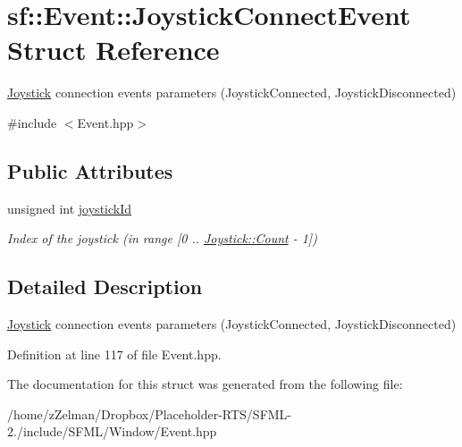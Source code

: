 \hypertarget{structsf_1_1Event_1_1JoystickConnectEvent}{\section{sf\-:\-:Event\-:\-:Joystick\-Connect\-Event Struct Reference}
\label{structsf_1_1Event_1_1JoystickConnectEvent}
}


\hyperlink{classsf_1_1Joystick}{Joystick} connection events parameters (Joystick\-Connected, Joystick\-Disconnected)  




{\ttfamily \#include $<$Event.\-hpp$>$}

\subsection*{Public Attributes}
\begin{DoxyCompactItemize}
\item 
\hypertarget{structsf_1_1Event_1_1JoystickConnectEvent_a08e58e8559d3e4fe4654855fec79194b}{unsigned int \hyperlink{structsf_1_1Event_1_1JoystickConnectEvent_a08e58e8559d3e4fe4654855fec79194b}{joystick\-Id}}\label{structsf_1_1Event_1_1JoystickConnectEvent_a08e58e8559d3e4fe4654855fec79194b}

\begin{DoxyCompactList}\small\item\em Index of the joystick (in range \mbox{[}0 .. \hyperlink{classsf_1_1Joystick_a951a7c775921304a5f3443c6e2bb4d65a6e0a2a95bc1da277610c04d80f52715e}{Joystick\-::\-Count} -\/ 1\mbox{]}) \end{DoxyCompactList}\end{DoxyCompactItemize}


\subsection{Detailed Description}
\hyperlink{classsf_1_1Joystick}{Joystick} connection events parameters (Joystick\-Connected, Joystick\-Disconnected) 

Definition at line 117 of file Event.\-hpp.



The documentation for this struct was generated from the following file\-:\begin{DoxyCompactItemize}
\item 
/home/z\-Zelman/\-Dropbox/\-Placeholder-\/\-R\-T\-S/\-S\-F\-M\-L-\/2./include/\-S\-F\-M\-L/\-Window/Event.\-hpp\end{DoxyCompactItemize}

